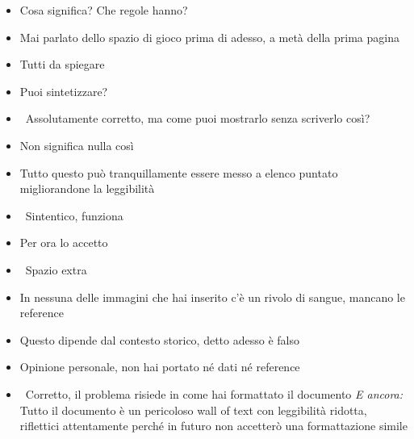 {\begin{itemize}
  \item {} Cosa significa? Che regole hanno?
  \item {} Mai parlato dello spazio di gioco prima di adesso, a metà della prima pagina
  \item {} Tutti da spiegare
  \item {} Puoi sintetizzare?
  \item {} \rvBene\ Assolutamente corretto, ma come puoi mostrarlo senza scriverlo così?
  \item {} Non significa nulla così
  \item {} Tutto questo può tranquillamente essere messo a elenco puntato migliorandone la leggibilità
  \item {} \rvBene\ Sintentico, funziona
  \item {} Per ora lo accetto
  \item \rvVuoto\ Spazio extra
  \item {} In nessuna delle immagini che hai inserito c'è un rivolo di sangue, mancano le reference
  \item {} Questo dipende dal contesto storico, detto adesso è falso
  \item {} Opinione personale, non hai portato né dati né reference
  \item {} \rvAvviso\ Corretto, il problema risiede in come hai formattato il documento \emph{E ancora:} Tutto il documento è un pericoloso wall of text con leggibilità ridotta, riflettici attentamente perché in futuro non accetterò una formattazione simile
\end{itemize}
}

